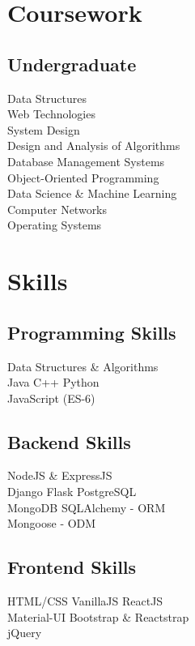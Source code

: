 \documentclass[]{deedy-resume-openfont}
\begin{document}
\begin{minipage}[t]{0.33\textwidth}

\section{Coursework}
\subsection{Undergraduate}
Data Structures \\
Web Technologies \\
System Design \\
Design and Analysis of Algorithms \\
Database Management Systems \\
Object-Oriented Programming \\
Data Science \& Machine Learning \\
Computer Networks\\
Operating Systems \\


\section{Skills}
\subsection{Programming Skills}
\textbullet{} Data Structures \& Algorithms \\
\textbullet{} Java 
\textbullet{} C++  
\textbullet{} Python \\
\textbullet{} JavaScript (ES-6) 

\sectionsep

\subsection{Backend Skills}
\textbullet{} NodeJS \& ExpressJS\\
\textbullet{} Django 
\textbullet{} Flask 
\textbullet{} PostgreSQL \\ 
\textbullet{} MongoDB 
\textbullet{} SQLAlchemy - ORM \\ 
\textbullet{} Mongoose - ODM \\ 

\sectionsep

\subsection{Frontend Skills}
\textbullet{} HTML/CSS 
\textbullet{} VanillaJS  
\textbullet{} ReactJS \\
\textbullet{} Material-UI 
\textbullet{} Bootstrap \& Reactstrap \\
\textbullet{} jQuery 


\end{minipage}
\end{document}
